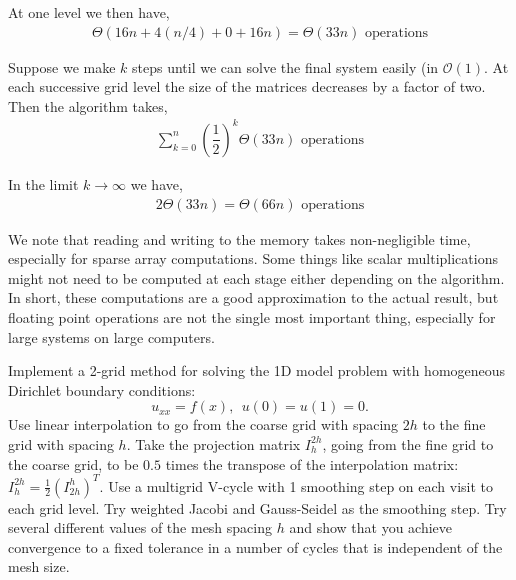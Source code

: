 \documentclass[10pt]{article}
\begin{document}
\begin{solution}[Solution]
\begin{enumerate}[label=(\alph*)]
        At one level we then have,
        \begin{align*}
            \Theta( 16n + 4(n/4) + 0 + 16n ) = \Theta( 33n ) \text{ operations}
        \end{align*}

        Suppose we make \( k \) steps until we can solve the final system easily (in \( \mathcal{O} (1) \). At each successive grid level the size of the matrices decreases by a factor of two. Then the algorithm takes,
        \begin{align*}
            \sum_{k=0}^{n} \left( \dfrac{1}{2} \right)^k \Theta(33 n) \text{ operations}
        \end{align*}
        
        In the limit \( k\to \infty \) we have,
        \begin{align*}
            2 \Theta(33 n) = \Theta(66n) \text{ operations}
        \end{align*}
        
        

        We note that reading and writing to the memory takes non-negligible time, especially for sparse array computations. Some things like scalar multiplications might not need to be computed at each stage either depending on the algorithm. In short, these computations are a good approximation to the actual result, but floating point operations are not the single most important thing, especially for large systems on large computers.

\end{enumerate}

\end{solution}

\begin{problem}[Problem 2]
Implement a 2-grid method for solving the 1D model problem with homogeneous Dirichlet boundary conditions:
\[
u_{xx} = f(x) ,~~u(0) = u(1) = 0.
\]
Use linear interpolation to go from the coarse grid with spacing \( 2h \) to the fine grid with spacing \( h \).  Take the projection matrix \( I_h^{2h} \), going from the fine grid to the coarse grid, to be \( 0.5 \) times the transpose of the interpolation matrix: \( I_h^{2h} = \frac{1}{2} ( I_{2h}^h )^T \). Use a multigrid V-cycle with 1 smoothing step on each visit to each grid level. Try weighted Jacobi and Gauss-Seidel as the smoothing step. Try several different values of the mesh spacing \( h \) and show that you achieve convergence to a fixed tolerance in a number of cycles that is independent of the mesh size.
\end{problem}
\end{document}
